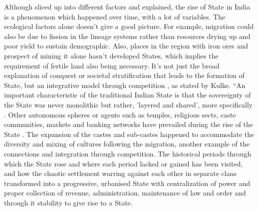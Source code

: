 \documentclass[a4paper]{article}
\begin{document}
Although sliced up into different factors and explained, the rise of
State in India is a phenomenon which happened over time, with a lot of
variables. The ecological factors alone doesn't give a good picture. For
example, migration could also be due to fission in the lineage systems
rather than resources drying up and poor yield to sustain demographic.
Also, places in the region with iron ores and prospect of mining it
alone hasn't developed States, which implies the requirement of fertile
land also being necessary.  It's not just the broad explanation of
conquest or societal stratification that leads to the formation of
State, but an integrative model through competition \cite[p.
8]{kimura2006state}, as stated by Kulke. ``An important characteristic
of the traditional Indian State is that the sovereignty of the State was
never monolithic but rather, 'layered and shared', more specifically
\cite[p. 8]{kimura2006state}.  Other autonomous spheres or agents such
as temples, religious sects, caste communities, markets and banking
networks have prevailed during the rise of the State
\cite[p.8]{kimura2006state}. The expansion of the castes and sub-castes
happened to accommodate the diversity and mixing of cultures following
the migration, another example of the connections and integration
through competition. The historical periods through which the
State rose and where each period lacked or gained has been visited, and
how the chaotic settlement warring against each other in separate clans
transformed into a progressive, urbanised State with centralization of
power and proper collection of revenue, administration, maintenance of
law and order and through it stability to give rise to a State.

\printbibliography 
\end{document}
